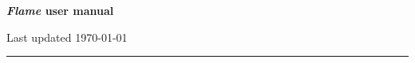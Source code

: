 \documentclass[a4paper]{article}
\author{%
\textsc{Sirio Belli}
\texttt{sirio@mpe.mpg.de}
    }
\makeatletter
\def\printauthor{%
    {\Large \@author}}
\makeatother
\begin{document}
\begin{titlepage}

\vspace*{1cm}
\noindent
\Huge \textbf{\textit{Flame} user manual}\par
\vspace*{1cm}
\noindent
\Large Last updated \today \\
\null\vfill
\vspace*{1cm}
\noindent
\begin{minipage}{0.02\linewidth}
    \rule{1pt}{50pt}
\end{minipage}
\begin{minipage}{0.35\linewidth}
    \begin{flushleft}
        \printauthor
    \end{flushleft}
\end{minipage}
%

\end{titlepage}


\newpage
\tableofcontents
\end{document}
